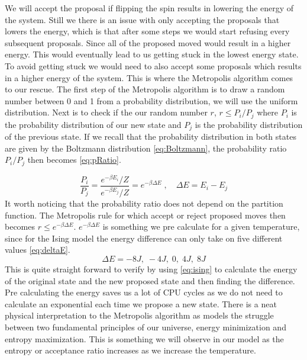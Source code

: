 We will
accept the proposal if flipping the spin results in lowering the energy of the
system. Still we there is an issue with only accepting the proposals that lowers
the energy, which is that after some steps we would start refusing every
subsequent proposals. Since all of the proposed moved would result in a higher
energy. This would eventually lead to us getting stuck in the lowest energy
state. To avoid getting stuck we would need to also accept some proposals which
results in a higher energy of the system. This is where the Metropolis
algorithm comes to our rescue. The first step of the Metropolis algorithm is to
draw a random number between 0 and 1 from a probability distribution, we will
use the uniform distribution. Next is to check if the our random number $r$,  $r \leq P_i
/P_j$ where $P_i$ is the probability distribution of our new state and $P_j$ is
the probability distribution of the previous state. If we recall that the
probability distribution in both states are given by the Boltzmann distribution
\cref{eq:Boltzmann}, the probability ratio $P_i/P_j$ then becomes \cref{eq:pRatio}.

\begin{equation}\label{eq:pRatio}
  \frac{P_i}{P_j} = \frac{e^{-\beta E_i}/Z}{e^{-\beta E_j}/Z} = e^{-\beta \Delta E} \; , \quad \Delta E = E_i - E_j
\end{equation}
It worth noticing that the probability ratio does not depend on the partition
function. The Metropolis rule for which accept or reject proposed moves then
becomes $r \leq e^{-\beta \Delta E}$.  $e^{-\beta \Delta E}$ is something we
pre calculate for a given temperature, since for the Ising
model the energy difference can only take on five different values \cref{eq:deltaE}.
\begin{equation}\label{eq:deltaE}
  \Delta E = -8J, \; -4J, \; 0, \; 4J, \; 8J
\end{equation}
This is quite straight forward to verify by using \cref{eq:ising} to calculate
the energy of the original state and the new proposed
state and then finding the difference. Pre calculating the energy saves us a lot
of CPU cycles as we do not need to calculate an exponential each time we propose
a new state. There is a neat physical interpretation to the Metropolis
algorithm as models the struggle between two fundamental principles of our
universe, energy minimization and entropy maximization. This is something we
will observe in our model as the entropy or acceptance ratio increases as we
increase the temperature. 


